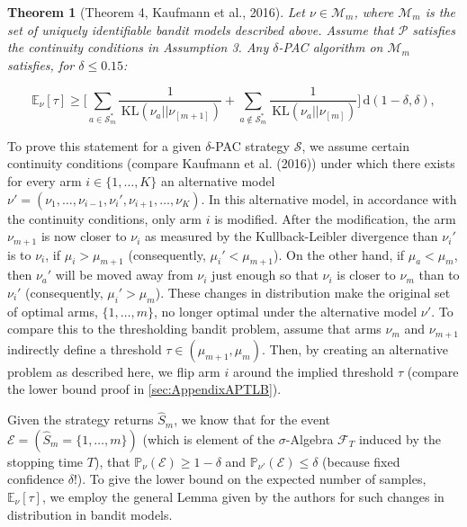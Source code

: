 \documentclass[11pt,]{article}
\newtheorem{theorem}{Theorem}
\newcommand{\KL}{\,\text{KL}}
\newcommand{\der}{\,\text{d}}
\begin{document}
\begin{theorem}[Theorem 4, Kaufmann et al., 2016] \label{theorem:KaufmannEtAlTheorem4}
Let $\nu \in \mathcal{M}_m$, where $\mathcal{M}_m$ is the set of uniquely identifiable bandit models described above. Assume that $\mathcal{P}$ satisfies the continuity conditions in Assumption 3. Any $\delta$-PAC algorithm on $\mathcal{M}_m$ satisfies, for $\delta \leq 0.15$:

\begin{equation*}
\mathbb{E}_{\nu}[\tau] \geq \Big[ \sum_{a \in \mathcal{S}^*_m} \frac{1}{\KL(\nu_a || \nu_{[m+1]})} + \sum_{a \notin \mathcal{S}^*_m} \frac{1}{\KL(\nu_a || \nu_{[m]})} \Big] \der(1-\delta, \delta),
\end{equation*}
\end{theorem}

To prove this statement for a given \(\delta\)-PAC strategy
\(\mathcal{S}\), we assume certain continuity conditions (compare
Kaufmann et al. (2016)) under which there exists for every arm
\(i \in \{1, \dots, K\}\) an alternative model
\(\nu' = (\nu_1, \dots, \nu_{i-1}, \nu_i', \nu_{i+1}, \dots, \nu_K)\).
In this alternative model, in accordance with the continuity conditions,
only arm \(i\) is modified. After the modification, the arm
\(\nu_{m+1}\) is now closer to \(\nu_i\) as measured by the
Kullback-Leibler divergence than \(\nu_i'\) is to \(\nu_i\), if
\(\mu_i > \mu_{m+1}\) (consequently, \(\mu_i' < \mu_{m+1}\)). On the
other hand, if \(\mu_a < \mu_{m}\), then \(\nu_a'\) will be moved away
from \(\nu_i\) just enough so that \(\nu_i\) is closer to \(\nu_m\) than
to \(\nu_i'\) (consequently, \(\mu_i' > \mu_m\)). These changes in
distribution make the original set of optimal arms, \(\{1,\dots,m\}\),
no longer optimal under the alternative model \(\nu'\). To compare this
to the thresholding bandit problem, assume that arms \(\nu_{m}\) and
\(\nu_{m+1}\) indirectly define a threshold
\(\tau \in (\mu_{m+1},\mu_m)\). Then, by creating an alternative problem
as described here, we flip arm \(i\) around the implied threshold
\(\tau\) (compare the lower bound proof in \autoref{sec:AppendixAPTLB}).

Given the strategy returns \(\hat{S}_m\), we know that for the event
\(\mathcal{E} = (\hat{S}_m = \{1, \dots, m\})\) (which is element of the
\(\sigma\)-Algebra \(\mathcal{F}_{T}\) induced by the stopping time
\(T\)), that \(\mathbb{P}_{\nu}(\mathcal{E}) \geq 1-\delta\) and
\(\mathbb{P}_{\nu'}(\mathcal{E}) \leq \delta\) (because fixed confidence
\(\delta\)!). To give the lower bound on the expected number of samples,
\(\mathbb{E}_{\nu}[\tau]\), we employ the general Lemma given by the
authors for such changes in distribution in bandit models.
\end{document}
